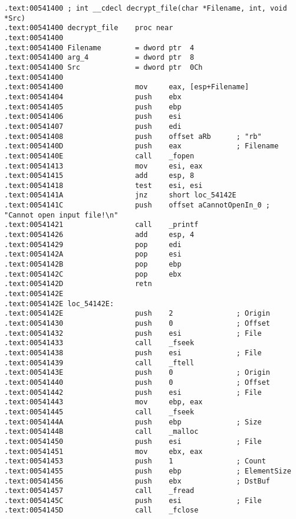 \begin{lstlisting}[style=customasmx86]
.text:00541400 ; int __cdecl decrypt_file(char *Filename, int, void *Src)
.text:00541400 decrypt_file    proc near
.text:00541400
.text:00541400 Filename        = dword ptr  4
.text:00541400 arg_4           = dword ptr  8
.text:00541400 Src             = dword ptr  0Ch
.text:00541400
.text:00541400                 mov     eax, [esp+Filename]
.text:00541404                 push    ebx
.text:00541405                 push    ebp
.text:00541406                 push    esi
.text:00541407                 push    edi
.text:00541408                 push    offset aRb      ; "rb"
.text:0054140D                 push    eax             ; Filename
.text:0054140E                 call    _fopen
.text:00541413                 mov     esi, eax
.text:00541415                 add     esp, 8
.text:00541418                 test    esi, esi
.text:0054141A                 jnz     short loc_54142E
.text:0054141C                 push    offset aCannotOpenIn_0 ; "Cannot open input file!\n"
.text:00541421                 call    _printf
.text:00541426                 add     esp, 4
.text:00541429                 pop     edi
.text:0054142A                 pop     esi
.text:0054142B                 pop     ebp
.text:0054142C                 pop     ebx
.text:0054142D                 retn
.text:0054142E
.text:0054142E loc_54142E:
.text:0054142E                 push    2               ; Origin
.text:00541430                 push    0               ; Offset
.text:00541432                 push    esi             ; File
.text:00541433                 call    _fseek
.text:00541438                 push    esi             ; File
.text:00541439                 call    _ftell
.text:0054143E                 push    0               ; Origin
.text:00541440                 push    0               ; Offset
.text:00541442                 push    esi             ; File
.text:00541443                 mov     ebp, eax
.text:00541445                 call    _fseek
.text:0054144A                 push    ebp             ; Size
.text:0054144B                 call    _malloc
.text:00541450                 push    esi             ; File
.text:00541451                 mov     ebx, eax
.text:00541453                 push    1               ; Count
.text:00541455                 push    ebp             ; ElementSize
.text:00541456                 push    ebx             ; DstBuf
.text:00541457                 call    _fread
.text:0054145C                 push    esi             ; File
.text:0054145D                 call    _fclose
\end{lstlisting}

